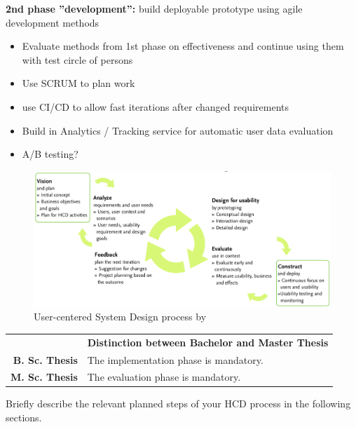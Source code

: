 \textbf{2nd phase ''development'':} build deployable prototype using agile development methods

\begin{itemize}
  \item Evaluate methods from 1st phase on effectiveness and continue using them with test circle of persons
  \item Use SCRUM to plan work
  \item use CI/CD to allow fast iterations after changed requirements
  \item Build in Analytics / Tracking service for automatic user data evaluation
  \item A/B testing?
\end{itemize}

\begin{figure}[h]
  \centering
  \includegraphics[width=\linewidth]{pics/hcd.png}
  \caption{User-centered System Design process by~\cite{gulliksenKeyPrinciplesUsercentred2003}}
\end{figure}

\begin{table}[htb]
\small
\colorbox{bamacolor}{
\centering
\begin{tabularx}{\textwidth}{@{} r Y @{}}
	&
	\textbf{Distinction between Bachelor and Master Thesis}\vspace{2mm}\\
    \textbf{B. Sc. Thesis} &
    The implementation phase is mandatory. \vspace{2mm}\\
	\textbf{M. Sc. Thesis} &
	The evaluation phase is mandatory. \vspace{2mm}\\

\end{tabularx}
}
\end{table}

Briefly describe the relevant planned steps of your HCD process in the following sections.

